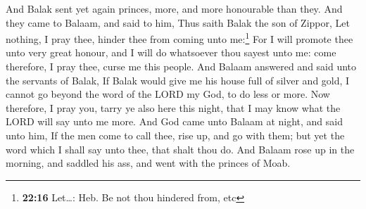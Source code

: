  And Balak sent yet again princes, more, and more
honourable than they.  And they came to Balaam, and said
to him, Thus saith Balak the son of Zippor, Let nothing, I pray thee,
hinder thee from coming unto me:\footnote{\textbf{22:16} Let\ldots: Heb.
  Be not thou hindered from, etc}  For I will promote
thee unto very great honour, and I will do whatsoever thou sayest unto
me: come therefore, I pray thee, curse me this people. 
And Balaam answered and said unto the servants of Balak, If Balak would
give me his house full of silver and gold, I cannot go beyond the word
of the LORD my God, to do less or more.  Now therefore, I
pray you, tarry ye also here this night, that I may know what the LORD
will say unto me more.  And God came unto Balaam at
night, and said unto him, If the men come to call thee, rise up, and go
with them; but yet the word which I shall say unto thee, that shalt thou
do.  And Balaam rose up in the morning, and saddled his
ass, and went with the princes of Moab.

